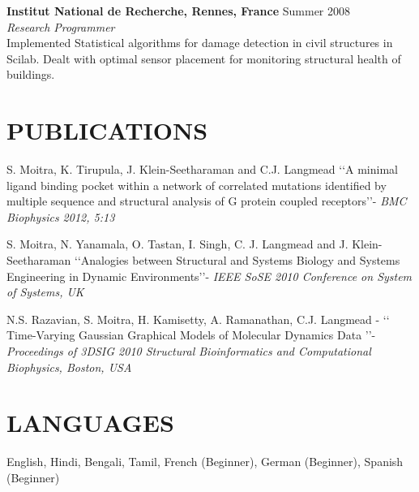 \documentclass[margin]{res}
\begin{document}
\begin{resume}
																								
                {\textbf{Institut National de Recherche, Rennes, France } } \hfill Summer 2008 \\
                {\sl Research Programmer } \\
                Implemented Statistical algorithms for damage detection in civil structures in Scilab. Dealt with optimal sensor placement for monitoring structural health of buildings.
                            
        				
\section{PUBLICATIONS}   S. Moitra, K. Tirupula, J. Klein-Seetharaman and C.J. Langmead \lq\lq{A minimal ligand binding pocket within a network of correlated mutations identified by multiple sequence and structural analysis of G protein coupled receptors}\rq\rq -  \textit{BMC Biophysics 2012, 5:13}	

S. Moitra, N. Yanamala, O. Tastan, I. Singh, C. J. Langmead and J. Klein-Seetharaman  \lq\lq{Analogies between Structural and Systems Biology and Systems Engineering in Dynamic Environments}\rq\rq -  \textit{IEEE SoSE 2010 Conference on System of Systems, UK}

 N.S. Razavian, S. Moitra, H. Kamisetty, A. Ramanathan, C.J. Langmead - \lq\lq{ Time-Varying Gaussian Graphical Models of Molecular Dynamics Data} \rq\rq - \textit{ Proceedings of 3DSIG 2010 Structural Bioinformatics and Computational Biophysics, Boston, USA}

\section{LANGUAGES} English, Hindi, Bengali, Tamil, French (Beginner), German (Beginner),
					 Spanish (Beginner)



                                    

\end{resume}
\end{document}
